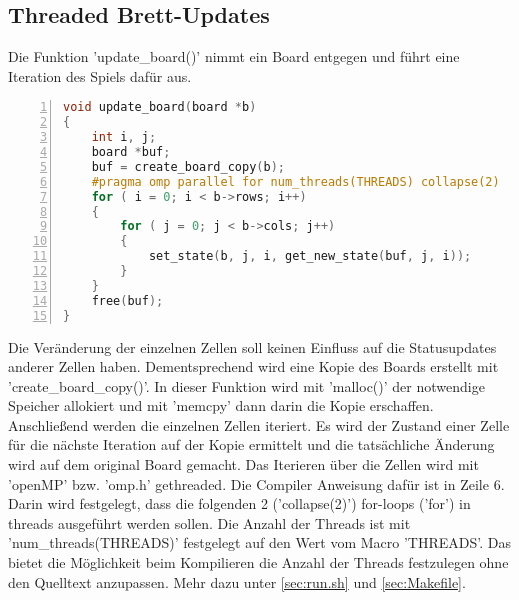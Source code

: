 \documentclass[plainarticle,zihtitle,german,final,hyperref,utf8]{zihpub}
\begin{document}
\subsection{Threaded Brett-Updates}
Die Funktion 'update\_board()' nimmt ein Board entgegen und führt eine Iteration des Spiels dafür aus.

\begin{lstlisting}[language=c, numbers=left]
void update_board(board *b)
{
	int i, j;
	board *buf;
	buf = create_board_copy(b);
	#pragma omp parallel for num_threads(THREADS) collapse(2)
	for ( i = 0; i < b->rows; i++)
	{
		for ( j = 0; j < b->cols; j++)
		{
			set_state(b, j, i, get_new_state(buf, j, i));
		}
	}
	free(buf); 
}
\end{lstlisting}\label{code:update_board}

Die Veränderung der einzelnen Zellen soll keinen Einfluss auf die Statusupdates anderer Zellen haben. Dementsprechend wird eine Kopie des Boards erstellt mit 'create\_board\_copy()'. In dieser Funktion wird mit 'malloc()' der notwendige Speicher allokiert und mit 'memcpy' dann darin die Kopie erschaffen. Anschließend werden die einzelnen Zellen iteriert. Es wird der Zustand einer Zelle für die nächste Iteration auf der Kopie ermittelt und die tatsächliche Änderung wird auf dem original Board gemacht.\newline
Das Iterieren über die Zellen wird mit 'openMP' bzw. 'omp.h' gethreaded. Die Compiler Anweisung dafür ist in Zeile 6. Darin wird festgelegt, dass die folgenden 2 ('collapse(2)') for-loops ('for') in threads ausgeführt werden sollen. Die Anzahl der Threads ist mit 'num\_threads(THREADS)' festgelegt auf den Wert vom Macro 'THREADS'. Das bietet die Möglichkeit beim Kompilieren die Anzahl der Threads festzulegen ohne den Quelltext anzupassen. Mehr dazu unter \ref{sec:run.sh} und \ref{sec:Makefile}.
\end{document}
